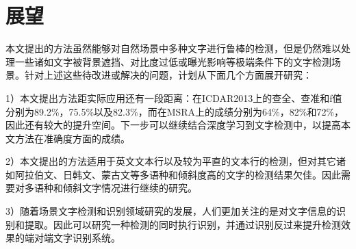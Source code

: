     \section{展望}

    本文提出的方法虽然能够对自然场景中多种文字进行鲁棒的检测，但是仍然难以处理一些诸如文字被背景遮挡、对比度过低或曝光影响等极端条件下的文字检测场景。针对上述这些待改进或解决的问题，计划从下面几个方面展开研究：

    1）本文提出方法距实际应用还有一段距离：在ICDAR2013上的查全、查准和f值分别为89.2\%，75.5\%以及82.3\%，而在MSRA上的成绩分别为64\%，82\%和72\%，因此还有较大的提升空间。下一步可以继续结合深度学习到文字检测中，以提高本文方法在准确度方面的成绩。

    2）本文提出的方法适用于英文文本行以及较为平直的文本行的检测，但对其它诸如阿拉伯文、日韩文、蒙古文等多语种和倾斜度高的文字的检测结果欠佳。因此需要对多语种和倾斜文字情况进行继续的研究。

    3）随着场景文字检测和识别领域研究的发展，人们更加关注的是对文字信息的识别和提取。因此可以研究一种检测的同时执行识别，并通过识别反过来提升检测效果的端对端文字识别系统。

